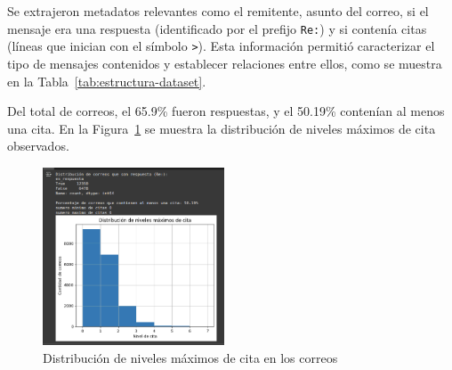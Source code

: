 \documentclass[journal]{IEEEtran}
\begin{document}
\vspace{12pt}
Se extrajeron metadatos relevantes como el remitente, asunto del correo, si el mensaje era una respuesta (identificado por el prefijo \texttt{Re:}) y si contenía citas (líneas que inician con el símbolo \texttt{>}). Esta información permitió caracterizar el tipo de mensajes contenidos y establecer relaciones entre ellos, como se muestra en la Tabla~\ref{tab:estructura-dataset}.

\begin{table}[!t]
\centering
\caption{Ejemplo de estructura del dataset después del preprocesamiento}
\label{tab:estructura-dataset}
\end{table}
\vspace{12pt}
Del total de correos, el 65.9\% fueron respuestas, y el 50.19\% contenían al menos una cita. En la Figura~\ref{fig:niveles-cita} se muestra la distribución de niveles máximos de cita observados.

\begin{figure}[H]
    \centering
    \includegraphics[width=0.48\textwidth]{fig1.png}
    \caption{Distribución de niveles máximos de cita en los correos}
    \label{fig:niveles-cita}
\end{figure}
\end{document}
